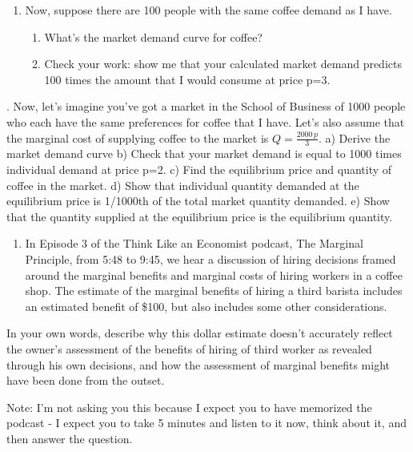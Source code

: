 \documentclass[11pt,]{article}
\providecommand{\tightlist}{%
  \setlength{\itemsep}{0pt}\setlength{\parskip}{0pt}}
\begin{document}
\newpage

\begin{enumerate}
\def\labelenumi{\arabic{enumi}.}
\setcounter{enumi}{1}
\tightlist
\item
  Now, suppose there are 100 people with the same coffee demand as I
  have.

  \begin{enumerate}
  \def\labelenumii{\alph{enumii})}
  \tightlist
  \item
    What's the market demand curve for coffee?
  \item
    Check your work: show me that your calculated market demand predicts
    100 times the amount that I would consume at price p=3.
  \end{enumerate}
\end{enumerate}


. Now, let's imagine you've got a market in the School of Business of
1000 people who each have the same preferences for coffee that I have.
Let's also assume that the marginal cost of supplying coffee to the
market is \(Q=\frac{2000\,p}{3}\). a) Derive the market demand curve b)
Check that your market demand is equal to 1000 times individual demand
at price p=2. c) Find the equilibrium price and quantity of coffee in
the market. d) Show that individual quantity demanded at the equilibrium
price is 1/1000th of the total market quantity demanded. e) Show that
the quantity supplied at the equilibrium price is the equilibrium
quantity.

\newpage

\begin{enumerate}
\def\labelenumi{\arabic{enumi}.}
\setcounter{enumi}{3}
\tightlist
\item
  In Episode 3 of the Think Like an Economist podcast, The Marginal
  Principle, from 5:48 to 9:45, we hear a discussion of hiring decisions
  framed around the marginal benefits and marginal costs of hiring
  workers in a coffee shop. The estimate of the marginal benefits of
  hiring a third barista includes an estimated benefit of \$100, but
  also includes some other considerations.
\end{enumerate}

In your own words, describe why this dollar estimate doesn't accurately
reflect the owner's assessment of the benefits of hiring of third worker
as revealed through his own decisions, and how the assessment of
marginal benefits might have been done from the outset.

Note: I'm not asking you this because I expect you to have memorized the
podcast - I expect you to take 5 minutes and listen to it now, think
about it, and then answer the question.
\end{document}
